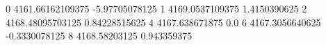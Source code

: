 0 4161.66162109375 -5.97705078125
1 4169.0537109375 1.4150390625
2 4168.48095703125 0.84228515625
4 4167.638671875 0.0
6 4167.3056640625 -0.3330078125
8 4168.58203125 0.943359375
